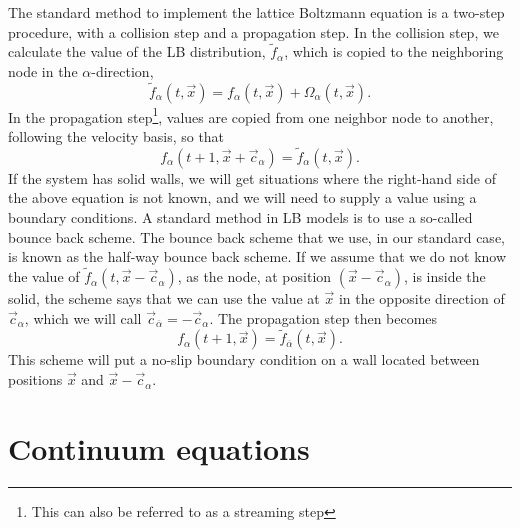 \documentclass[11pt,a4paper]{report}
\begin{document}
The standard method to implement the lattice Boltzmann equation is a two-step procedure, with a collision step and a propagation step. In the collision step, we calculate the value of the LB distribution, $\tilde{f}_\alpha$, which is copied to the neighboring node in the $\alpha$-direction,
\begin{equation}
\tilde{f}_\alpha(t, \vec{x}) = f_\alpha(t, \vec{x}) + \Omega_\alpha(t, \vec{x}). 
\end{equation}
In the propagation step\footnote{This can also be referred to as  a streaming step}, values are copied from one neighbor node to another, following the velocity basis, so that
\begin{equation}
f_\alpha(t+1, \vec{x}+\vec{c}_\alpha) = \tilde{f}_\alpha(t, \vec{x}).
\end{equation} 
If the system has solid walls, we will get situations where the right-hand side of the above equation is not known, and we will need to supply a value using a boundary conditions. A standard method in LB models is to use a so-called bounce back scheme. The bounce back scheme that we use, in our standard case, is known as the half-way bounce back scheme. If we assume that we do not know the value of $\tilde{f}_\alpha(t, \vec{x}-\vec{c}_\alpha)$, as the node, at position $(\vec{x}-\vec{c}_\alpha)$, is inside the solid, the scheme says that we can use the value at $\vec{x}$ in the opposite direction of $\vec{c}_\alpha$, which we will call $\vec{c}_{\overline{\alpha}} = -\vec{c}_\alpha$. The propagation step then becomes
\begin{equation*}
f_\alpha(t+1, \vec{x}) = \tilde{f}_{\overline{\alpha}}(t, \vec{x}).
\end{equation*}  
This scheme will put a no-slip boundary condition on a wall located between positions $\vec{x}$ and $\vec{x}-\vec{c}_\alpha$.

\section{Continuum equations}
\label{sec:continuum_eqs}
\end{document}
